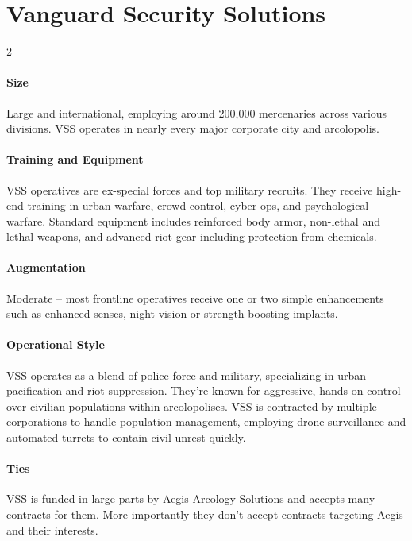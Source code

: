 \setcounter{section}{1}
\section*{Vanguard Security Solutions}
\vspace{5mm}
\begin{multicols}{2}
\paragraph{Size}
Large and international, employing around 200,000 mercenaries across various divisions. VSS operates in nearly every major corporate city and arcolopolis.
\paragraph{Training and Equipment}
VSS operatives are ex-special forces and top military recruits. They receive high-end training in urban warfare, crowd control, cyber-ops, and psychological warfare. Standard equipment includes reinforced body armor, non-lethal and lethal weapons, and advanced riot gear including protection from chemicals.
\paragraph{Augmentation}
Moderate – most frontline operatives receive one or two simple enhancements such as enhanced senses, night vision or strength-boosting implants.
\paragraph{Operational Style}
VSS operates as a blend of police force and military, specializing in urban pacification and riot suppression. They’re known for aggressive, hands-on control over civilian populations within arcolopolises. VSS is contracted by multiple corporations to handle population management, employing drone surveillance and automated turrets to contain civil unrest quickly.
\paragraph{Ties}
VSS is funded in large parts by Aegis Arcology Solutions and accepts many contracts for them. More importantly they don't accept contracts targeting Aegis and their interests.
\end{multicols}

